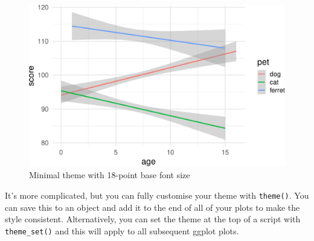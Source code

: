 \documentclass[
  oneside]{book}
\begin{document}
\begin{figure}

{\centering \includegraphics[width=0.9\linewidth]{images/themes-1} 

}

\caption{Minimal theme with 18-point base font size}\label{fig:themes}
\end{figure}

It's more complicated, but you can fully customise your theme with \texttt{theme()}. You can save this to an object and add it to the end of all of your plots to make the style consistent. Alternatively, you can set the theme at the top of a script with \texttt{theme\_set()} and this will apply to all subsequent ggplot plots.
\end{document}
